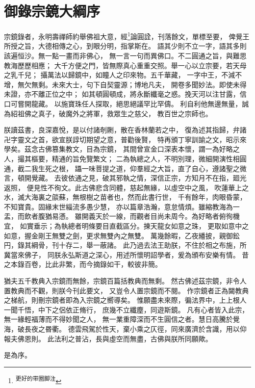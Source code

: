 
\clearpage
\section*{御錄宗鏡大綱序}



宗鏡錄者，永明壽禪師約舉佛祖大意，經\footnote{\textsuperscript{更好的带圈脚注}}論圓詮，刊落餘文，單標至要，
俾覺王所授之旨，大德相傳之心，到眼分明，指掌斯在。
語其少則不立一字，語其多則該遍恒沙。無一點一畫而非佛心，
無一言一句而異佛口。不二圓通之旨，與難思教海歷歷相應；
大千方便之門，皆無際真心重重交照。舉一心以立宗要，若天母之乳千兒；
攝萬法以歸鏡中，如瞳人之印來物。五千華藏，
一字中王，不減不增，無欠無剩。未來大士，句下自契靈源；博地凡夫，
開卷多聞妙法。即使未得未證，亦不離正位之中；
如其頓圓頓成，將永斷纖毫之惑。挽天河以注甘露，信口可嘗開龍藏。
以施寶珠任人探取，絕思絕議罕比罕儔。
利自利他無邊無量，誠為紹祖佛之真子，破魔外之將軍，救眾生之慈父，
教百世之宗師也。

朕讀茲書，良深嘉悅，是以付諸剞劂，散在香林蘭若之中，
復為述其指歸，弁諸卍字靈文之首，欲宣朕諄切期望之意，普勸後賢，
特再頒丁寧訓諭之文，昭示來學矣。茲念古佛篡集教文，目為宗鏡，
其間曾宣金口深表本懷，謂一為好略之人，撮其樞要，精通的旨免覽繁文；
二為執總之人，不明別理，微細開演性相圓通，截二我生死之根，
躡一味菩提之道，仰羣經之大旨，直了自心，遵諸聖之微言，頓開覺藏。
去彼依通之見，破其邪執之情，深信正宗，方知月不在指，廻光返照，
便見性不徇文。此古佛悲含同體，慈起無緣，以虛空中之風，
吹蓮華上之水，滅大海裏之燄蘇，無根樹之苗者也，然而此書行世，
千有餘年，肉眼昏蒙，不知寶貴。固緣末世緇流多愚少慧，
亦以篇章浩瀚，意怠情煩。雖縮教海為一盂，而飲者腹猶易懣。
雖開義天於一線，而觀者目尚未周今。為好略者俯徇機宜，
如實垂示；為執總者明條要目直截區分。揀天龍女如意之珠，
更取如意中之如意，握金剛王無雙之劍，更求無雙內之無雙。
萬幾餘暇，乙夜繙披，親御鈆円，錄其綱骨，刊十存二，舉一蔽諸。
此乃過去法王助朕，不住於相之布施，所冀當來佛子，
同朕永弘斯道之深心，用述所懷明詔學者，爰為頒布安樂有情。
昔之本錄百卷，比此非繁，而今摘錄如干，較彼非簡。


猶夫五千教典入宗鏡而無餘，宗鏡百篇括教典而無剩。
然古佛述茲宗鏡，非令人置教典而不觀，則朕今刊此要文，
又豈令人置宗鏡而不閱。
作宗鏡者正為闚教典之梯航，則刪宗鏡者即為入宗鏡之嚮導矣。
惟願盡未來際，徧法界中，上上根人一聞千悟，中下之侶依正脩行，
庶幾不立纖塵，同遊斯鏡。
凡有心者皆入此宗，無一緣輕福薄而不得妙聞之人，
無一業重障深而不生圓信之者。慧日高騰於覺海，破長夜之昬衢。
德雲飛駕於性天，棄小乘之仄徑，同來廣濟於含識，用以仰報夫佛恩則。
此法利之普沾，長與虛空而無盡，古佛與朕所同願歟。

是為序。
